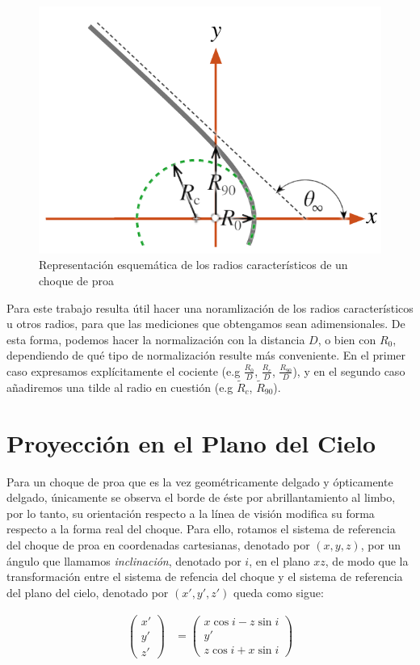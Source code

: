 \begin{figure}
  \includegraphics[width=0.5\linewidth]{./Figures/characteristic-radii}
  \caption{Representación esquemática de los radios característicos
    de un choque de proa}
    \label{fig:char-radii}
\end{figure}
Para este trabajo resulta útil hacer una noramlización de los radios
característicos u otros radios, para que las mediciones que obtengamos
sean adimensionales. De esta forma, podemos hacer la normalización con
la distancia $D$, o bien con $R_0$, dependiendo de qué tipo de
normalización resulte más conveniente. En el primer caso expresamos
explícitamente el cociente (e.g $\frac{R_0}{D}$, $\frac{R_c}{D}$,
$\frac{R_{90}}{D}$), y en el segundo caso añadiremos una tilde al
radio en cuestión (e.g $\tilde{R}_c$, $\tilde{R}_{90}$). 

\section{Proyección en el Plano del Cielo}
\label{sec:projection}

Para un choque de proa que es la vez geométricamente delgado y
ópticamente delgado, únicamente se observa el borde de éste por
abrillantamiento al limbo, por lo tanto, su orientación respecto a
la línea de visión modifica su forma respecto a la forma real del
choque. Para ello, rotamos el sistema de referencia del choque de proa
en coordenadas cartesianas, denotado por $(x, y, z)$, por un ángulo
que llamamos \textit{inclinación}, denotado por $i$, en el plano $xz$,
de modo que la transformación entre el sistema de refencia del choque
y el sistema de referencia del plano del cielo, denotado por
$(x', y', z')$ queda como sigue:

\begin{align}
  \left(
  \begin{array}{c}
    x' \\ y' \\ z'
  \end{array}
  \right) &=
  \left(
  \begin{array}{c}
    x\cos i - z\sin i \\ y' \\ z\cos i + x\sin i
  \end{array}
  \right)
  \label{eq:rotation}
\end{align}


